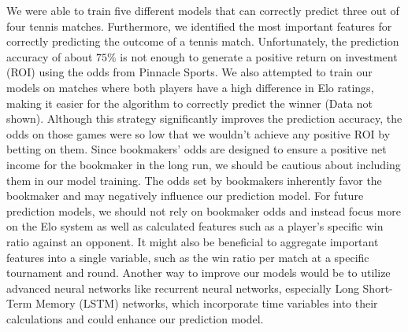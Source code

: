 \documentclass[preprint,aps,nofootinbib,a4paper,superscriptaddress,longbibliography,amsfonts,amssymb,amsmath,titlepage]{revtex4-2}
\begin{document}
We were able to train five different models that can correctly predict three out of four tennis matches. Furthermore, we identified the most important features for correctly predicting the outcome of a tennis match. Unfortunately, the prediction accuracy of about $75 \%$ is not enough to generate a positive return on investment (ROI) using the odds from Pinnacle Sports. We also attempted to train our models on matches where both players have a high difference in Elo ratings, making it easier for the algorithm to correctly predict the winner (Data not shown). Although this strategy significantly improves the prediction accuracy, the odds on those games were so low that we wouldn’t achieve any positive ROI by betting on them. Since bookmakers' odds are designed to ensure a positive net income for the bookmaker in the long run, we should be cautious about including them in our model training. The odds set by bookmakers inherently favor the bookmaker and may negatively influence our prediction model. For future prediction models, we should not rely on bookmaker odds and instead focus more on the Elo system as well as calculated features such as a player's specific win ratio against an opponent. It might also be beneficial to aggregate important features into a single variable, such as the win ratio per match at a specific tournament and round. Another way to improve our models would be to utilize advanced neural networks like recurrent neural networks, especially Long Short-Term Memory (LSTM) networks, which incorporate time variables into their calculations and could enhance our prediction model.



\appendix
\end{document}
